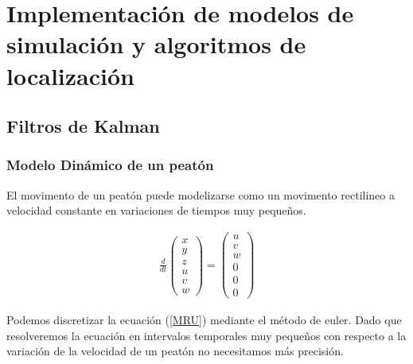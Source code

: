 \chapter{Implementación de modelos de simulación y algoritmos de localización}


\section{Filtros de Kalman}
\subsection{Modelo Dinámico de un peatón}

El movimento de un peatón puede modelizarse como un movimento rectilineo a velocidad constante en variaciones de tiempos muy pequeños. 

\begin{gather}\label{MRU}
    \frac{d}{dt}
    \begin{pmatrix}
        x \\ y \\ z \\
        u \\ v \\ w 
    \end{pmatrix} = 
    \begin{pmatrix}
        u \\ v \\ w \\
        0 \\ 0 \\ 0       
    \end{pmatrix}
\end{gather}

Podemos discretizar la ecuación (\ref{MRU}) mediante el método de euler. Dado que resolveremos la ecuación en intervalos temporales muy pequeños con respecto a la variación de la velocidad de un peatón no necesitamos más precisión. 

